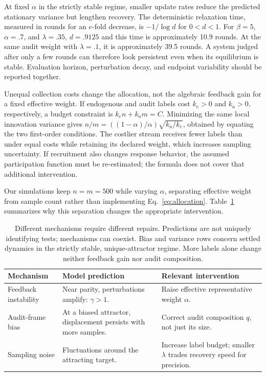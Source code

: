 \documentclass{article}
\begin{document}
At fixed $\alpha$ in the strictly stable regime, smaller update rates reduce the predicted stationary variance but lengthen recovery. The deterministic relaxation time, measured in rounds for an $e$-fold decrease, is $-1/\log d$ for $0<d<1$. For $\beta=5$, $\alpha=.7$, and $\lambda=.35$, $d=.9125$ and this time is approximately 10.9 rounds. At the same audit weight with $\lambda=.1$, it is approximately 39.5 rounds. A system judged after only a few rounds can therefore look persistent even when its equilibrium is stable. Evaluation horizon, perturbation decay, and endpoint variability should be reported together.

Unequal collection costs change the allocation, not the algebraic feedback gain for a fixed effective weight. If endogenous and audit labels cost $k_e>0$ and $k_a>0$, respectively, a budget constraint is $k_e n+k_a m=C$. Minimizing the same local innovation variance gives $n/m=((1-\alpha)/\alpha)\sqrt{k_a/k_e}$, obtained by equating the two first-order conditions. The costlier stream receives fewer labels than under equal costs while retaining its declared weight, which increases sampling uncertainty. If recruitment also changes response behavior, the assumed participation function must be re-estimated; the formula does not cover that additional intervention.

Our simulations keep $n=m=500$ while varying $\alpha$, separating effective weight from sample count rather than implementing Eq.~\eqref{eq:allocation}. Table~\ref{tab:diagnosis} summarizes why this separation changes the appropriate intervention.

\begin{table}[t]\centering
\caption{Different mechanisms require different repairs. Predictions are not uniquely identifying tests; mechanisms can coexist. Bias and variance rows concern settled dynamics in the strictly stable, unique-attractor regime. More labels alone change neither feedback gain nor audit composition.}
\label{tab:diagnosis}
\begin{tabular}{p{.21\linewidth}p{.35\linewidth}p{.34\linewidth}}\toprule
Mechanism & Model prediction & Relevant intervention\\\midrule
Feedback instability & Near parity, perturbations amplify: $\gamma>1$. & Raise effective representative weight $\alpha$.\\
Audit-frame bias & At a biased attractor, displacement persists with more samples. & Correct audit composition $q$, not just its size.\\
Sampling noise & Fluctuations around the attracting target. & Increase label budget; smaller $\lambda$ trades recovery speed for precision.\\\bottomrule
\end{tabular}
\end{table}
\end{document}
